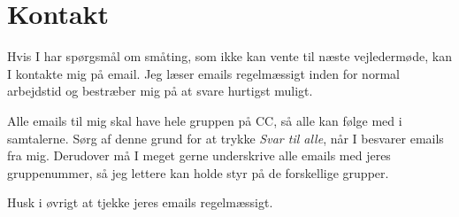 \section{Kontakt}
\label{sec:contact}
Hvis I har spørgsmål om småting, som ikke kan vente til næste vejledermøde, kan I kontakte mig på email.
Jeg læser emails regelmæssigt inden for normal arbejdstid og bestræber mig på at svare hurtigst muligt.

Alle emails til mig skal have hele gruppen på CC, så alle kan følge med i samtalerne.
Sørg af denne grund for at trykke \emph{Svar til alle}, når I besvarer emails fra mig.
Derudover må I meget gerne underskrive alle emails med jeres gruppenummer, så jeg lettere kan holde styr på de forskellige grupper.

Husk i øvrigt at tjekke jeres emails regelmæssigt.
